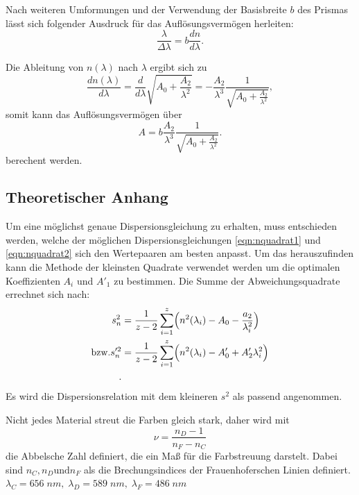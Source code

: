 Nach weiteren Umformungen und der Verwendung der Basisbreite $b$ des
Prismas lässt sich folgender Ausdruck für das Auflösungsvermögen
herleiten:
\begin{equation}
  \frac{\lambda}{\Delta \lambda}=b\frac{dn}{d\lambda}.
  \label{eqn:auflösungsvermögen}
\end{equation}

Die Ableitung von $n(\lambda)$ nach $\lambda$ ergibt sich zu
\begin{equation}
  \frac{dn(\lambda)}{d\lambda}=\frac{d}{d\lambda}\sqrt{A_0+\frac{A_2}{\lambda^2}}
  =-\frac{A_2}{\lambda^3}\frac{1}{\sqrt{A_0+\frac{A_2}{\lambda^2}}},
\end{equation}
somit kann das Auflösungsvermögen über
\begin{equation}
  A=b\frac{A_2}{\lambda^3}\frac{1}{{\sqrt{A_0+\frac{A_2}{\lambda^2}}}}.
  \label{eqn:auflösungsver}
\end{equation}
berechent werden.

\subsection{Theoretischer Anhang}
Um eine möglichst genaue Dispersionsgleichung zu erhalten, muss
entschieden werden, welche der möglichen Dispersionsgleichungen
\ref{eqn:nquadrat1} und \ref{eqn:nquadrat2} sich den Wertepaaren
am besten anpasst. Um das herauszufinden kann die Methode der
kleinsten Quadrate verwendet werden um die optimalen Koeffizienten
$A_i$ und $A'_1$ zu bestimmen.
Die Summe der Abweichungsquadrate errechnet sich nach:
\begin{align}
  s_{n}^{2}&=\frac{1}{z-2}\sum_{i=1}^{z} \Bigl(n^2(\lambda_i)-A_0-\frac{a_2}{\lambda_{i}^{2}}\Bigr) \\
  \text{bzw.}
  s_{n}'^{2}&=\frac{1}{z-2}\sum_{i=1}^{z} \Bigl(n^2(\lambda_i)-A'_0+A'_{2}\lambda_{i}^{2}\Bigr) \\.
  \label{eqn:abweichungquadrat}
\end{align}
Es wird die Dispersionsrelation mit dem kleineren $s^2$ als passend angenommen.

Nicht jedes Material streut die Farben gleich stark, daher wird mit
\begin{equation}
  \nu=\frac{n_D -1}{n_F-n_C}
  \label{eqn:abbel}
\end{equation}
die Abbelsche Zahl definiert, die ein Maß für die Farbstreuung darstelt.
Dabei sind $n_C, n_D \text{und} n_F$ als die Brechungsindices der Frauenhoferschen
Linien definiert.\\
$\lambda_C=656\;nm,\;\lambda_D=589\;nm,\;\lambda_F=486\;nm$
